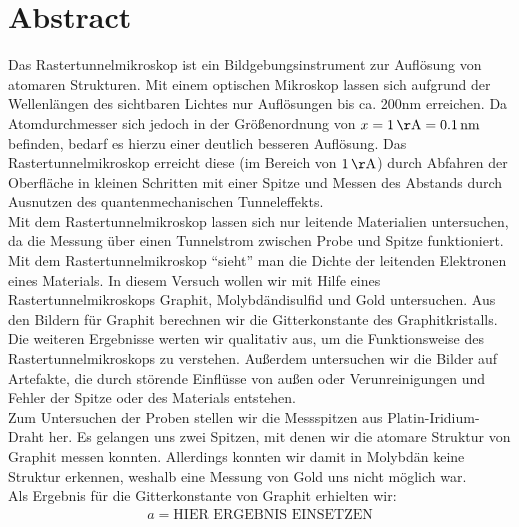 \documentclass[12pt,listof=totoc]{scrartcl}
\title{\vspace{0cm}{\Huge Fortgeschrittenen-Praktikum I:\\ \vspace{1cm} Rastertunnelmikroskop}}
\author{Saskia Bondza\\Simon Stephan}
\date{durchgeführt am 07. und 10.10.2016}
\begin{document}
\maketitle
\newpage

\section*{Abstract}
Das Rastertunnelmikroskop ist ein Bildgebungsinstrument zur Auflösung von atomaren Strukturen. Mit einem optischen Mikroskop lassen sich aufgrund der Wellenlängen des sichtbaren Lichtes nur Auflösungen bis ca. 200nm erreichen. Da Atomdurchmesser sich jedoch in der Größenordnung von $x=1\,\mathrm{\AA}=0.1\,\mathrm{nm}$ befinden, bedarf es hierzu einer deutlich besseren Auflösung. Das Rastertunnelmikroskop erreicht diese (im Bereich von $1\,\mathrm{\AA}$) durch Abfahren der Oberfläche in kleinen Schritten mit einer Spitze und Messen des Abstands durch Ausnutzen des quantenmechanischen Tunneleffekts.\\

Mit dem Rastertunnelmikroskop lassen sich nur leitende Materialien untersuchen, da die Messung über einen Tunnelstrom zwischen Probe und Spitze funktioniert. Mit dem Rastertunnelmikroskop "`sieht"' man die Dichte der leitenden Elektronen eines Materials. In diesem Versuch wollen wir mit Hilfe eines Rastertunnelmikroskops Graphit, Molybdändisulfid und Gold untersuchen. Aus den Bildern für Graphit berechnen wir die Gitterkonstante des Graphitkristalls. Die weiteren Ergebnisse werten wir qualitativ aus, um die Funktionsweise des Rastertunnelmikroskops zu verstehen. Außerdem untersuchen wir die Bilder auf Artefakte, die durch störende Einflüsse von außen oder Verunreinigungen und Fehler der Spitze oder des Materials entstehen.\\

Zum Untersuchen der Proben stellen wir die Messspitzen aus Platin-Iridium-Draht her. Es gelangen uns zwei Spitzen, mit denen wir die atomare Struktur von Graphit messen konnten. Allerdings konnten wir damit in Molybdän keine Struktur erkennen, weshalb eine Messung von Gold uns nicht möglich war.\\

Als Ergebnis für die Gitterkonstante von Graphit erhielten wir:
\begin{align*}
	a=\text{HIER ERGEBNIS EINSETZEN}
\end{align*}

\newpage
\end{document}
